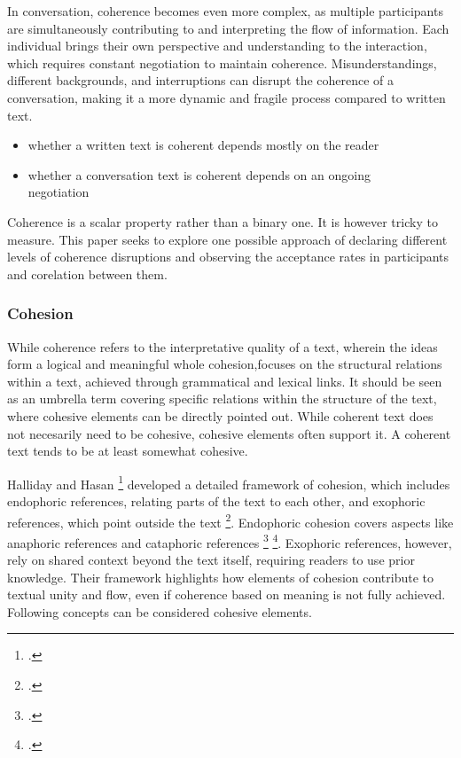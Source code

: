 \documentclass[12pt]{report}
\begin{document}
{\par
    In conversation, coherence becomes even more complex,
    as multiple participants are simultaneously contributing to and interpreting the flow of information.
    Each individual brings their own perspective and understanding to the interaction,
    which requires constant negotiation to maintain coherence.
    Misunderstandings, different backgrounds, and interruptions
    can disrupt the coherence of a conversation,
    making it a more dynamic and fragile process compared to written text.

\begin{itemize}
\item
whether a written text is coherent depends mostly on the reader
\item
whether a conversation text is coherent depends on an ongoing\\ negotiation
\end{itemize}

\par
    Coherence is a scalar property rather than a binary one.
    It is however tricky to measure.
    This paper seeks to explore one possible approach of
    declaring different levels of coherence disruptions
    and observing the acceptance rates in participants
    and corelation between them.

\subsubsection{Cohesion}
\par
    While coherence refers to the interpretative quality of a text,
    wherein the ideas form a logical and meaningful whole
    cohesion,focuses on the structural relations
    within a text, achieved through grammatical and lexical links.
    It should be seen as an umbrella term
    covering specific relations within
    the structure of the text,
    where cohesive elements can be directly pointed out.
    While coherent text does not necesarily need to be cohesive,
    cohesive elements often support it.
    A coherent text tends to be at least somewhat cohesive.

\par
    Halliday and Hasan \footcite{Halliday76cohesion} developed
    a detailed framework of cohesion, which includes
    endophoric references,
    relating parts of the text to each other, and
    exophoric references, which point outside the text \footcite[p.~31]{Halliday76cohesion}.
    Endophoric cohesion covers aspects
    like anaphoric references and cataphoric references \footcite{hajicovasgall2003} \footcite{loaiciga-etal-2022-anaphoric}.
    Exophoric references, however, rely on shared context beyond the text itself,
    requiring readers to use prior knowledge.
    Their framework highlights how elements of cohesion
    contribute to textual unity and flow, even
    if coherence based on meaning is not fully achieved.
    Following concepts can be considered cohesive elements.

}
\end{document}
